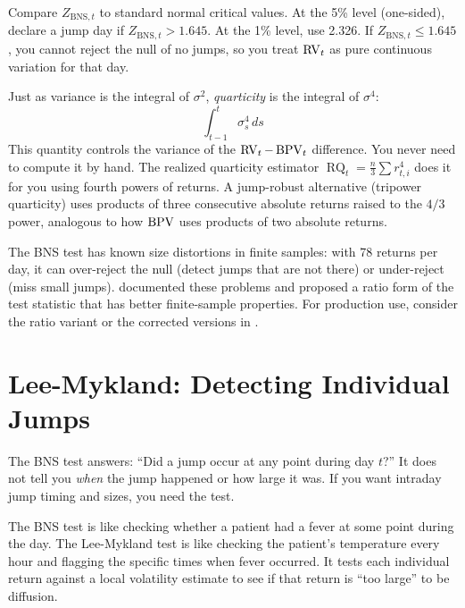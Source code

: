 \begin{keyidea}
Compare $Z_{\text{BNS},t}$ to standard normal critical values.
At the 5\% level (one-sided), declare a jump day if $Z_{\text{BNS},t} > 1.645$.
At the 1\% level, use 2.326.
If $Z_{\text{BNS},t} \leq 1.645$, you cannot reject the null of no jumps, so you treat $\operatorname{RV}_t$ as pure continuous variation for that day.
\end{keyidea}

\begin{prereq}[Quarticity]
Just as variance is the integral of $\sigma^2$, \emph{quarticity} is the integral of $\sigma^4$:
\[
  \int_{t-1}^{t}\sigma^4_s\,ds
\]
This quantity controls the variance of the $\operatorname{RV}_t - \operatorname{BPV}_t$ difference.
You never need to compute it by hand.
The realized quarticity estimator $\operatorname{RQ}_t = \frac{n}{3}\sum r_{t,i}^4$ does it for you using fourth powers of returns.  A jump-robust alternative (tripower quarticity) uses products of three consecutive absolute returns raised to the $4/3$ power, analogous to how $\operatorname{BPV}$ uses products of two absolute returns.
\end{prereq}

\begin{warning}
The BNS test has known size distortions in finite samples: with 78 returns per day, it can over-reject the null (detect jumps that are not there) or under-reject (miss small jumps).
\citet{HuangTauchen2005} documented these problems and proposed a ratio form of the test statistic that has better finite-sample properties.
For production use, consider the ratio variant or the corrected versions in \citet{BNS2006}.
\end{warning}


\section{Lee-Mykland: Detecting Individual Jumps}
\label{sec:lee-mykland}

The BNS test answers: ``Did a jump occur at any point during day $t$?''
It does not tell you \emph{when} the jump happened or how large it was.
If you want intraday jump timing and sizes, you need the \citet{LeeMykland2008} test.

\begin{intuition}
The BNS test is like checking whether a patient had a fever at some point during the day.
The Lee-Mykland test is like checking the patient's temperature every hour and flagging the specific times when fever occurred.
It tests each individual return against a local volatility estimate to see if that return is ``too large'' to be diffusion.
\end{intuition}

